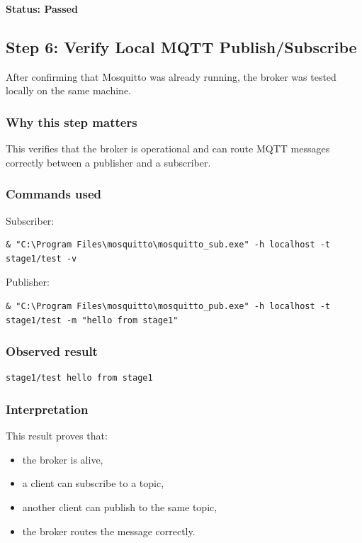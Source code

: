\documentclass[12pt,a4paper]{article}
\begin{document}
\textbf{Status: Passed}

\subsection{Step 6: Verify Local MQTT Publish/Subscribe}

After confirming that Mosquitto was already running, the broker was tested
locally on the same machine.

\subsubsection*{Why this step matters}

This verifies that the broker is operational and can route MQTT messages
correctly between a publisher and a subscriber.

\subsubsection*{Commands used}

Subscriber:

\begin{lstlisting}
& "C:\Program Files\mosquitto\mosquitto_sub.exe" -h localhost -t stage1/test -v
\end{lstlisting}

Publisher:

\begin{lstlisting}
& "C:\Program Files\mosquitto\mosquitto_pub.exe" -h localhost -t stage1/test -m "hello from stage1"
\end{lstlisting}

\subsubsection*{Observed result}

\begin{lstlisting}
stage1/test hello from stage1
\end{lstlisting}

\subsubsection*{Interpretation}

This result proves that:

\begin{itemize}
    \item the broker is alive,
    \item a client can subscribe to a topic,
    \item another client can publish to the same topic,
    \item the broker routes the message correctly.
\end{itemize}
\end{document}
